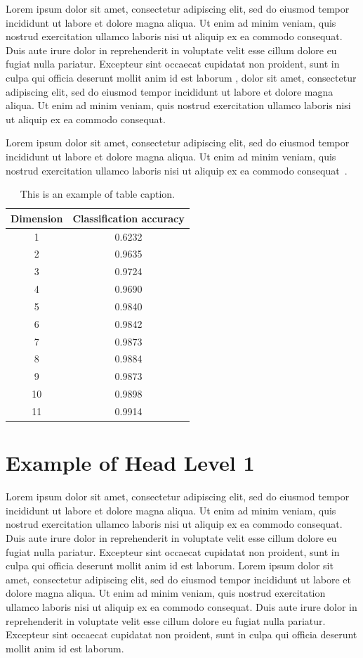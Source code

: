 \documentclass[english]{sbc2025}%
\begin{document}
Lorem ipsum dolor sit amet, consectetur adipiscing elit, sed do eiusmod tempor incididunt ut labore et dolore magna aliqua. Ut enim ad minim veniam, quis nostrud exercitation ullamco laboris nisi ut aliquip ex ea commodo consequat. Duis aute irure dolor in reprehenderit in voluptate velit esse cillum dolore eu fugiat nulla pariatur. Excepteur sint occaecat cupidatat non proident, sunt in culpa qui officia deserunt mollit anim id est laborum \citep{ref3}, dolor sit amet, consectetur adipiscing elit, sed do eiusmod tempor incididunt ut labore et dolore magna aliqua. Ut enim ad minim veniam, quis nostrud exercitation ullamco laboris nisi ut aliquip ex ea commodo consequat.

Lorem ipsum dolor sit amet, consectetur adipiscing elit, sed do eiusmod tempor incididunt ut labore et dolore magna aliqua. Ut enim ad minim veniam, quis nostrud exercitation ullamco laboris nisi ut aliquip ex ea commodo consequat~\citep{ref4}.

\begin{table}[!ht]
\caption{This is an example of table caption.}
\centering
\begin{tabular}{@{}cc@{}}
\hline\hline
Dimension & Classification accuracy \\
\hline%
 1  & 0.6232 \\
 2  & 0.9635 \\ 
 3  & 0.9724 \\ 
 4  & 0.9690 \\ 
 5  & 0.9840 \\ 
 6  & 0.9842 \\ 
 7  & 0.9873 \\ 
 8  & 0.9884 \\
 9  & 0.9873 \\ 
 10 & 0.9898 \\ 
 11 & 0.9914 \\
\hline\hline
\end{tabular}
\label{tab1}
\end{table}

 
\section{Example of Head Level 1}
Lorem ipsum dolor sit amet, consectetur adipiscing elit, sed do eiusmod tempor incididunt ut labore et dolore magna aliqua. Ut enim ad minim veniam, quis nostrud exercitation ullamco laboris nisi ut aliquip ex ea commodo consequat. Duis aute irure dolor in reprehenderit in voluptate velit esse cillum dolore eu fugiat nulla pariatur. Excepteur sint occaecat cupidatat non proident, sunt in culpa qui officia deserunt mollit anim id est laborum. Lorem ipsum dolor sit amet, consectetur adipiscing elit, sed do eiusmod tempor incididunt ut labore et dolore magna aliqua. Ut enim ad minim veniam, quis nostrud exercitation ullamco laboris nisi ut aliquip ex ea commodo consequat. Duis aute irure dolor in reprehenderit in voluptate velit esse cillum dolore eu fugiat nulla pariatur. Excepteur sint occaecat cupidatat non proident, sunt in culpa qui officia deserunt mollit anim id est laborum.
\end{document}
